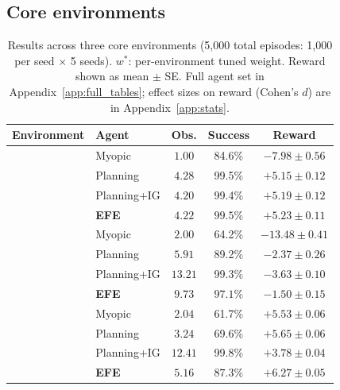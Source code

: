 \documentclass{article}
\begin{document}
\subsection{Core environments}

\begin{table}[ht]
\centering
\caption{Results across three core environments (5{,}000 total episodes: 1{,}000 per seed $\times$ 5 seeds). $w^*$: per-environment tuned weight. Reward shown as mean $\pm$ SE. Full agent set in Appendix~\ref{app:full_tables}; effect sizes on reward (Cohen's $d$) are in Appendix~\ref{app:stats}.}
\label{tab:main}
\begin{small}
\begin{tabular}{llccc}
\toprule
Environment & Agent & Obs. & Success & Reward \\
\midrule
{} & Myopic & $1.00$ & 84.6\% & $-7.98 \pm 0.56$ \\
& Planning & $4.28$ & 99.5\% & $+5.15 \pm 0.12$ \\
& Planning+IG & $4.20$ & 99.4\% & $+5.19 \pm 0.12$ \\
& \textbf{EFE} & $\mathbf{4.22}$ & $\mathbf{99.5\%}$ & $\mathbf{+5.23 \pm 0.11}$ \\
\midrule
{} & Myopic & $2.00$ & 64.2\% & $-13.48 \pm 0.41$ \\
& Planning & $5.91$ & 89.2\% & $-2.37 \pm 0.26$ \\
& Planning+IG & $13.21$ & 99.3\% & $-3.63 \pm 0.10$ \\
& \textbf{EFE} & $\mathbf{9.73}$ & $\mathbf{97.1\%}$ & $\mathbf{-1.50 \pm 0.15}$ \\
\midrule
{} & Myopic & $2.04$ & 61.7\% & $+5.53 \pm 0.06$ \\
& Planning & $3.24$ & 69.6\% & $+5.65 \pm 0.06$ \\
& Planning+IG & $12.41$ & 99.8\% & $+3.78 \pm 0.04$ \\
& \textbf{EFE} & $\mathbf{5.16}$ & $\mathbf{87.3\%}$ & $\mathbf{+6.27 \pm 0.05}$ \\
\bottomrule
\end{tabular}
\end{small}
\end{table}
\end{document}
